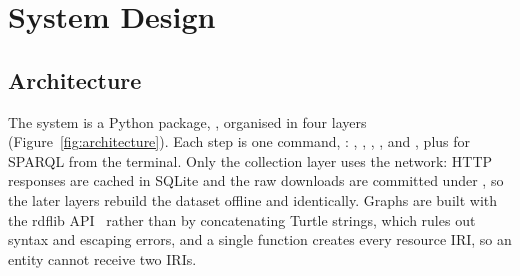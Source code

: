 \section{System Design}
\label{sec:design}

\subsection{Architecture}
\label{sec:architecture}

The system is a Python package, , organised in four layers
(Figure~\ref{fig:architecture}). Each step is one command,
: , ,
, ,  and , plus
 for SPARQL from the terminal. Only the collection layer uses the
network: HTTP responses are cached in SQLite and the raw downloads are
committed under , so the later layers rebuild the dataset
offline and identically. Graphs are built with the rdflib API~\cite{rdflib}
rather than by concatenating Turtle strings, which rules out syntax and
escaping errors, and a single function creates every resource IRI, so an
entity cannot receive two IRIs.

